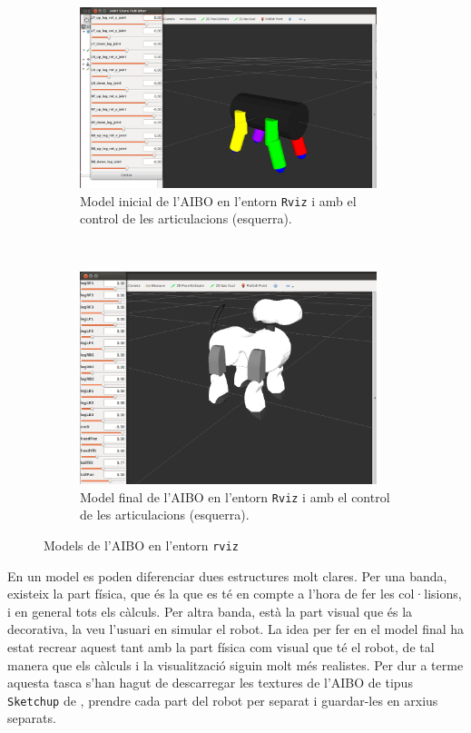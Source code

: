 \documentclass[12pt,a4paper,final,twoside]{report}
\begin{document}
\begin{figure}[tb]
\centering
\begin{subfigure}[b]{0.45\textwidth}
    \centering
    \includegraphics[width=0.95\textwidth]{Imatges/aibo-model-inicial.png}
    \caption{Model inicial de l'AIBO en l'entorn \texttt{Rviz} i amb el control de les articulacions (esquerra).}
    \label{fig:aibo-model-inicial}
\end{subfigure}
~
\begin{subfigure}[b]{0.45\textwidth}
    \centering
    \includegraphics[width=0.95\textwidth]{Imatges/aibo-model-final.png}
    \caption{Model final de l'AIBO en l'entorn \texttt{Rviz} i amb el control de les articulacions (esquerra).}
    \label{fig:aibo-model-final}
\end{subfigure}
\caption{Models de l'AIBO en l'entorn \texttt{rviz}}
\end{figure}

En un model es poden diferenciar dues estructures molt clares. Per una banda, existeix la part física, que és la que es té en compte a l'hora de fer les col·lisions, i en general tots els càlculs. Per altra banda, està la part visual que és la decorativa, la veu l'usuari en simular el robot. La idea per fer en el model final ha estat recrear aquest tant amb la part física com visual que té el robot, de tal manera que els càlculs i la visualització siguin molt més realistes. Per dur a terme aquesta tasca s'han hagut de descarregar les textures de l'AIBO de tipus \texttt{Sketchup} de \cite{SeaGate}, prendre cada part del robot per separat i guardar-les en arxius separats. 
\end{document}
